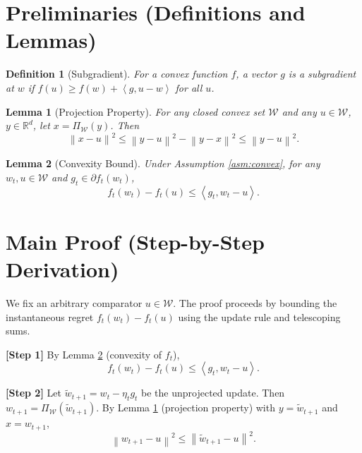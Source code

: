 \documentclass{article}
\newtheorem{lemma}{Lemma}
\newtheorem{definition}{Definition}
\newcommand{\R}{\mathbb{R}}
\newcommand{\norm}[1]{\left\| #1 \right\|}
\newcommand{\inner}[2]{\left\langle #1, #2 \right\rangle}
\newcommand{\step}[1]{\textbf{[Step #1]}}
\begin{document}
\section*{Preliminaries (Definitions and Lemmas)}

\begin{definition}[Subgradient]
For a convex function $f$, a vector $g$ is a subgradient at $w$ if $f(u) \ge f(w) + \inner{g}{u-w}$ for all $u$.
\end{definition}

\begin{lemma}[Projection Property] \label{lem:projection}
For any closed convex set $\mathcal{W}$ and any $u \in \mathcal{W}$, $y \in \R^d$, let $x = \Pi_{\mathcal{W}}(y)$. Then
\begin{equation}
    \norm{x - u}^2 \le \norm{y - u}^2 - \norm{y - x}^2 \le \norm{y - u}^2.
\end{equation}
\end{lemma}

\begin{lemma}[Convexity Bound] \label{lem:convexity}
Under Assumption \ref{asm:convex}, for any $w_t, u \in \mathcal{W}$ and $g_t \in \partial f_t(w_t)$,
\begin{equation}
    f_t(w_t) - f_t(u) \le \inner{g_t}{w_t - u}.
\end{equation}
\end{lemma}

\section*{Main Proof (Step-by-Step Derivation)}

We fix an arbitrary comparator $u \in \mathcal{W}$. The proof proceeds by bounding the instantaneous regret $f_t(w_t) - f_t(u)$ using the update rule and telescoping sums.

\step{1} By Lemma \ref{lem:convexity} (convexity of $f_t$),
\begin{equation}
    f_t(w_t) - f_t(u) \le \inner{g_t}{w_t - u}. \tag{1}
\end{equation}

\step{2} Let $\tilde{w}_{t+1} = w_t - \eta_t g_t$ be the unprojected update. Then $w_{t+1} = \Pi_{\mathcal{W}}(\tilde{w}_{t+1})$. By Lemma \ref{lem:projection} (projection property) with $y = \tilde{w}_{t+1}$ and $x = w_{t+1}$,
\begin{equation}
    \norm{w_{t+1} - u}^2 \le \norm{\tilde{w}_{t+1} - u}^2. \tag{2}
\end{equation}
\end{document}
